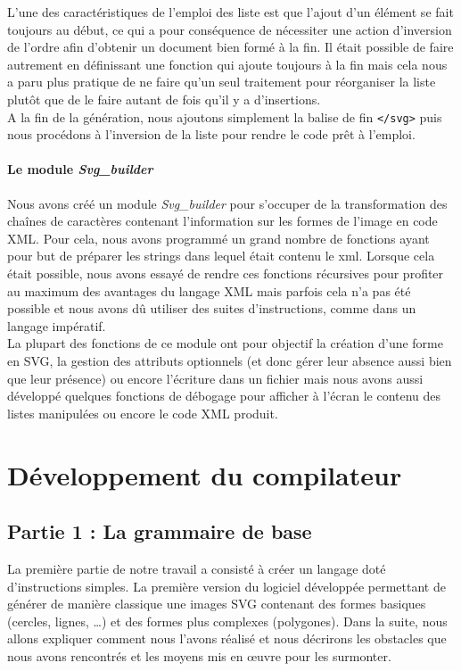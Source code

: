 		L'une des caractéristiques de l'emploi des liste est que l'ajout d'un élément se fait toujours au début, ce qui a pour conséquence de nécessiter une action d'inversion de l'ordre afin d'obtenir un document bien formé à la fin. Il était possible de faire autrement en définissant une fonction qui ajoute toujours à la fin mais cela nous a paru plus pratique de ne faire qu'un seul traitement pour réorganiser la liste plutôt que de le faire autant de fois qu'il y a d'insertions.\\
	
		A la fin de la génération, nous ajoutons simplement la balise de fin \texttt{</svg>} puis nous procédons à l'inversion de la liste pour rendre le code prêt à l'emploi. 
	
			
			\subsubsection{Le module \emph{Svg\_builder}}
			Nous avons créé un module \emph{Svg\_builder} pour s'occuper de la transformation des chaînes de caractères contenant l'information sur les formes de l'image en code XML. Pour cela, nous avons programmé un grand nombre de fonctions ayant pour but de préparer les strings dans lequel était contenu le xml. Lorsque cela était possible, nous avons essayé de rendre ces fonctions récursives pour profiter au maximum des avantages du langage XML mais parfois cela n'a pas été possible et nous avons dû utiliser des suites d'instructions, comme dans un langage impératif.\\
			
			La plupart des fonctions de ce module ont pour objectif la création d'une forme en SVG, la gestion des attributs optionnels (et donc gérer leur absence aussi bien que leur présence) ou encore l'écriture dans un fichier mais nous avons aussi développé quelques fonctions de débogage pour afficher à l'écran le contenu des listes manipulées ou encore le code XML produit.
		
	
\chapter{Développement du compilateur}
	
	\section{Partie 1 : La grammaire de base}
		La première partie de notre travail a consisté à créer un langage doté d'instructions simples. 	La première version du logiciel développée permettant de générer de manière classique une images SVG contenant des formes basiques (cercles, lignes, \dots) et des formes plus complexes (polygones). Dans la suite, nous allons expliquer comment nous l'avons réalisé et nous décrirons les obstacles que nous avons rencontrés et les moyens mis en œuvre pour les surmonter.


